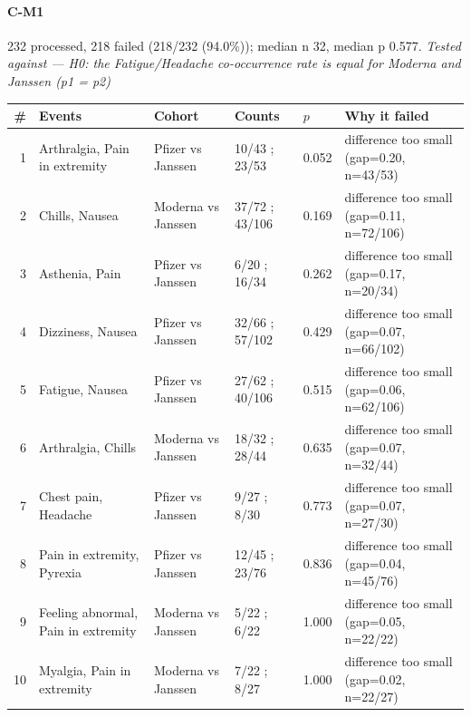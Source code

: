 \documentclass[11pt]{article}
\begin{document}
\paragraph{C-M1} 232 processed, 218 failed (218/232 (94.0\%)); median n 32, median p 0.577. \emph{Tested against --- H0: the Fatigue/Headache co-occurrence rate is equal for Moderna and Janssen (p1 = p2)} \\
\begin{longtable}{@{}r p{3.9cm} p{2.5cm} l l p{4.4cm}@{}}
\toprule
\# & Events & Cohort & Counts & $p$ & Why it failed \\
\midrule \endhead
1 & Arthralgia, Pain in extremity & Pfizer vs Janssen & 10/43 ; 23/53 & 0.052 & difference too small (gap=0.20, n=43/53) \\
2 & Chills, Nausea & Moderna vs Janssen & 37/72 ; 43/106 & 0.169 & difference too small (gap=0.11, n=72/106) \\
3 & Asthenia, Pain & Pfizer vs Janssen & 6/20 ; 16/34 & 0.262 & difference too small (gap=0.17, n=20/34) \\
4 & Dizziness, Nausea & Pfizer vs Janssen & 32/66 ; 57/102 & 0.429 & difference too small (gap=0.07, n=66/102) \\
5 & Fatigue, Nausea & Pfizer vs Janssen & 27/62 ; 40/106 & 0.515 & difference too small (gap=0.06, n=62/106) \\
6 & Arthralgia, Chills & Moderna vs Janssen & 18/32 ; 28/44 & 0.635 & difference too small (gap=0.07, n=32/44) \\
7 & Chest pain, Headache & Pfizer vs Janssen & 9/27 ; 8/30 & 0.773 & difference too small (gap=0.07, n=27/30) \\
8 & Pain in extremity, Pyrexia & Pfizer vs Janssen & 12/45 ; 23/76 & 0.836 & difference too small (gap=0.04, n=45/76) \\
9 & Feeling abnormal, Pain in extremity & Moderna vs Janssen & 5/22 ; 6/22 & 1.000 & difference too small (gap=0.05, n=22/22) \\
10 & Myalgia, Pain in extremity & Moderna vs Janssen & 7/22 ; 8/27 & 1.000 & difference too small (gap=0.02, n=22/27) \\
\bottomrule
\end{longtable}
\end{document}
